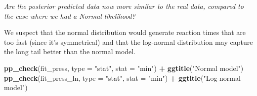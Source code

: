 \documentclass[12pt,ignorenonframetext,aspectratio=169]{beamer}
\newenvironment{Shaded}{\begin{snugshade}}{\end{snugshade}}
\newcommand{\DataTypeTok}[1]{\textcolor[rgb]{0.13,0.29,0.53}{#1}}
\newcommand{\KeywordTok}[1]{\textcolor[rgb]{0.13,0.29,0.53}{\textbf{#1}}}
\newcommand{\NormalTok}[1]{#1}
\newcommand{\OperatorTok}[1]{\textcolor[rgb]{0.81,0.36,0.00}{\textbf{#1}}}
\newcommand{\StringTok}[1]{\textcolor[rgb]{0.31,0.60,0.02}{#1}}
\begin{document}
\begin{frame}

\begin{block}{\emph{Are the posterior predicted data now more similar to the real data, compared to the case where we had a Normal likelihood?}}

\vspace{.1in}

We suspect that the normal distribution would generate reaction times that are too fast (since it's symmetrical) and that the log-normal distribution may capture the long tail better than the normal model.

\end{block}

\end{frame}

\begin{frame}[fragile]

\vspace{.1in}

\scriptsize

\begin{Shaded}
\begin{Highlighting}[]
\KeywordTok{pp_check}\NormalTok{(fit_press, }\DataTypeTok{type =} \StringTok{"stat"}\NormalTok{, }\DataTypeTok{stat =} \StringTok{"min"}\NormalTok{) }\OperatorTok{+}
\StringTok{  }\KeywordTok{ggtitle}\NormalTok{(}\StringTok{"Normal model"}\NormalTok{)}
\KeywordTok{pp_check}\NormalTok{(fit_press_ln, }\DataTypeTok{type =} \StringTok{"stat"}\NormalTok{, }\DataTypeTok{stat =} \StringTok{"min"}\NormalTok{) }\OperatorTok{+}
\StringTok{  }\KeywordTok{ggtitle}\NormalTok{(}\StringTok{"Log-normal model"}\NormalTok{)}
\end{Highlighting}
\end{Shaded}


\end{frame}
\end{document}
